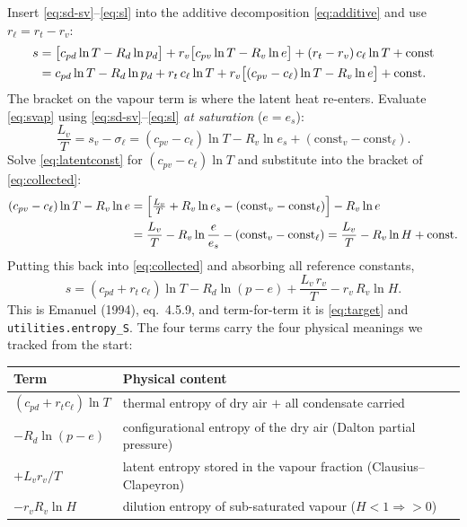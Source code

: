 \documentclass[11pt,a4paper]{article}
\theoremstyle{definition}
\newcommand{\Rd}{R_d}
\newcommand{\Rv}{R_v}
\newcommand{\cpd}{c_{pd}}
\newcommand{\cpv}{c_{pv}}
\newcommand{\cl}{c_\ell}
\newcommand{\Lv}{L_v}
\newcommand{\rt}{r_t}
\newcommand{\rvv}{r_v}
\newcommand{\rl}{r_\ell}
\newcommand{\es}{e_s}
\newcommand{\pd}{p_d}
\begin{document}
Insert \eqref{eq:sd-sv}--\eqref{eq:sl} into the additive decomposition
\eqref{eq:additive} and use $\rl=\rt-\rvv$:
\begin{align}
s &= \big[\cpd\ln T-\Rd\ln\pd\big]
   + \rvv\big[\cpv\ln T-\Rv\ln e\big]
   + (\rt-\rvv)\,\cl\ln T + \mathrm{const} \notag\\
  &= \cpd\ln T-\Rd\ln\pd
   + \rt\,\cl\ln T
   + \rvv\big[(\cpv-\cl)\ln T-\Rv\ln e\big] + \mathrm{const}.
\label{eq:collected}
\end{align}
The bracket on the vapour term is where the latent heat re-enters. Evaluate
\eqref{eq:svap} using \eqref{eq:sd-sv}--\eqref{eq:sl} \emph{at saturation}
($e=\es$):
\begin{equation}\label{eq:latentconst}
\frac{\Lv}{T}=s_v-\sigma_\ell
=(\cpv-\cl)\ln T-\Rv\ln\es+(\mathrm{const}_v-\mathrm{const}_\ell).
\end{equation}
Solve \eqref{eq:latentconst} for $(\cpv-\cl)\ln T$ and substitute into the
bracket of \eqref{eq:collected}:
\begin{align}
(\cpv-\cl)\ln T-\Rv\ln e
&=\Big[\tfrac{\Lv}{T}+\Rv\ln\es-(\mathrm{const}_v-\mathrm{const}_\ell)\Big]-\Rv\ln e
\notag\\
&=\frac{\Lv}{T}-\Rv\ln\frac{e}{\es}-(\mathrm{const}_v-\mathrm{const}_\ell)
 =\frac{\Lv}{T}-\Rv\ln H+\mathrm{const}.
\end{align}
Putting this back into \eqref{eq:collected} and absorbing all reference
constants,
\begin{equation}\label{eq:E94}
\boxed{\;s=(\cpd+\rt\,\cl)\ln T-\Rd\ln(p-e)+\frac{\Lv\,\rvv}{T}-\rvv\,\Rv\ln H.\;}
\end{equation}
This is Emanuel (1994), eq.~4.5.9, and term-for-term it is \eqref{eq:target}
and \texttt{utilities.entropy\_S}. The four terms carry the four physical
meanings we tracked from the start:
\begin{center}
\begin{tabular}{ll}
\toprule
Term & Physical content \\
\midrule
$(\cpd+\rt\cl)\ln T$ & thermal entropy of dry air $+$ all condensate carried\\
$-\Rd\ln(p-e)$ & configurational entropy of the dry air (Dalton partial pressure)\\
$+\Lv\rvv/T$ & latent entropy stored in the vapour fraction (Clausius--Clapeyron)\\
$-\rvv\Rv\ln H$ & dilution entropy of sub-saturated vapour ($H<1\Rightarrow{>}0$)\\
\bottomrule
\end{tabular}
\end{center}
\end{document}
